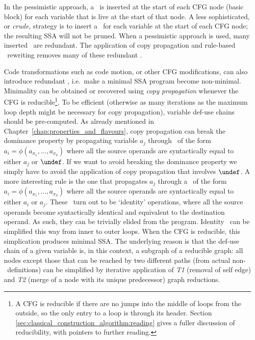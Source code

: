 In the pessimistic approach, a \phifun\ is inserted at the start of each CFG node
(basic block) for each variable that is live at the start of that
node.
A less sophisticated, or \textit{crude}, %
strategy is to insert a \phifun\ for
each variable at the start of each CFG node;
the resulting SSA will not be pruned.
When a pessimistic approach is used, many inserted \phifuns\ are
redundant. The application of 
copy propagation and rule-based \phifun\ rewriting
removes many of these redundant \phifuns.


Code transformations such as code motion, or other CFG modifications, 
can also introduce redundant \phifuns, i.e.\
make a minimal SSA program become non-minimal.
Minimality can be obtained or recovered using 
\textit{copy propagation} whenever the CFG is reducible\footnote{
A CFG is reducible if there are no jumps into the middle of loops
from the outside, so the only entry to a loop is through its header.
Section \ref{sec:classical_construction_algorithm:reading} 
gives a fuller discussion of reducibility, with
pointers to further reading.
}.
To be efficient (otherwise as many iterations as the maximum loop
depth might be necessary for copy propagation), 
variable def-use chains should be pre-computed. 
As already mentioned in Chapter~\ref{chap:properties_and_flavours}, 
copy propagation can break the dominance property by propagating
variable $a_j$ through \phifuns\ of the form $a_i=\phi(a_{x_1},\ldots,a_{x_k})$ where
all the source operands are syntactically equal to either $a_j$ or $\undef$. 
If we want to avoid breaking the dominance property we simply have to
avoid the application of copy propagation that involves $\undef$. 
A more interesting rule is the one that propagates $a_j$ through a
\phifun\ of the form $a_i=\phi(a_{x_1},\ldots,a_{x_k})$ where all the source operands are
syntactically equal to either $a_i$ or $a_j$. 
These \phifuns\ turn out to be `identity' operations, where all the
source operands become syntactically identical and equivalent to the 
destination operand. As such, they can be trivially elided from the program.
Identity \phifuns\ can be simplified this way from inner to outer loops. 
When the CFG is reducible, this simplication produces minimal SSA. 
The underlying reason is that the def-use chain of a given variable is,
in this context, a subgraph of a reducible graph: 
all nodes except those that can be reached by two different paths (from
actual non-\phifun\ definitions) can be simplified by iterative 
application of 
\emph{T1} (removal of self edge) and 
\emph{T2} (merge of a node with its unique predecessor) graph reductions.
